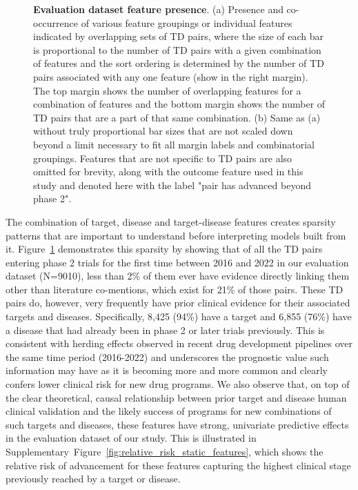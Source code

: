 \documentclass{article}
\begin{document}
\begin{figure}[!htb]
  \centering
  \captionsetup{width=.9\linewidth}
  \captionsetup[subfigure]{labelformat=empty}
  \qquad
  \caption{
    \textbf{Evaluation dataset feature presence}.
    (a) Presence and co-occurrence of various feature groupings or individual features indicated by overlapping sets of TD pairs, where the size of each bar is proportional to the number of TD pairs with a given combination of features and the sort ordering is determined by the number of TD pairs associated with any one feature (show in the right margin). The top margin shows the number of overlapping features for a combination of features and the bottom margin shows the number of TD pairs that are a part of that same combination.
    (b) Same as (a) without truly proportional bar sizes that are not scaled down beyond a limit necessary to fit all margin labels and combinatorial groupings. Features that are not specific to TD pairs are also omitted for brevity, along with the outcome feature used in this study and denoted here with the label "pair has advanced beyond phase 2".
  }
  \label{fig:feature_presence}
\end{figure}

The combination of target, disease and target-disease features creates sparsity patterns that are important to understand before interpreting models built from it. Figure~\ref{fig:feature_presence} demonstrates this sparsity by showing that of all the TD pairs entering phase 2 trials for the first time between 2016 and 2022 in our evaluation dataset (N=9010), less than 2\% of them ever have evidence directly linking them other than literature co-mentions, which exist for 21\% of those pairs. These TD pairs do, however, very frequently have prior clinical evidence for their associated targets and diseases. Specifically, 8,425 (94\%) have a target and 6,855 (76\%) have a disease that had already been in phase 2 or later trials previously. This is consistent with herding effects observed in recent drug development pipelines \cite{PMID:37117303} over the same time period (2016-2022) and underscores the prognostic value such information may have as it is becoming more and more common and clearly confers lower clinical risk for new drug programs. We also observe that, on top of the clear theoretical, causal relationship between prior target and disease human clinical validation and the likely success of programs for new combinations of such targets and diseases, these features have strong, univariate predictive effects in the evaluation dataset of our study. This is illustrated in Supplementary~Figure~\ref{fig:relative_risk_static_features}, which shows the relative risk of advancement for these features capturing the highest clinical stage previously reached by a target or disease.
\end{document}
